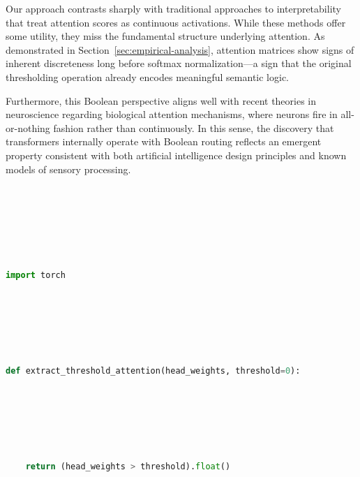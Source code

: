 Our approach contrasts sharply with traditional approaches to interpretability that treat attention scores as continuous activations. While these methods offer some utility, they miss the fundamental structure underlying attention. As demonstrated in Section~\ref{sec:empirical-analysis}, attention matrices show signs of inherent discreteness long before softmax normalization—a sign that the original thresholding operation already encodes meaningful semantic logic.













Furthermore, this Boolean perspective aligns well with recent theories in neuroscience regarding biological attention mechanisms, where neurons fire in all-or-nothing fashion rather than continuously. In this sense, the discovery that transformers internally operate with Boolean routing reflects an emergent property consistent with both artificial intelligence design principles and known models of sensory processing.













\begin{lstlisting}[language=python, caption={Sample Code for Threshold Function Extraction}]






import torch






def extract_threshold_attention(head_weights, threshold=0):






    return (head_weights > threshold).float()






\end{lstlisting}













